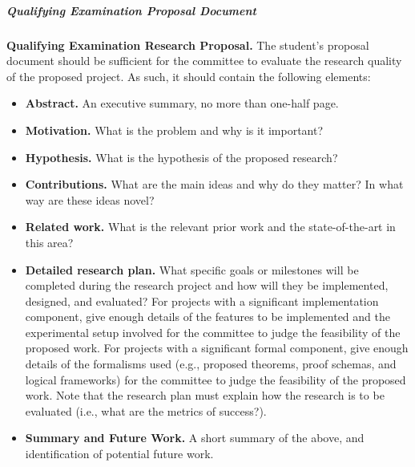 


\hypertarget{qualifying-examination-proposal-document}{
\subparagraph{Qualifying Examination Proposal Document}
\label{qualifying-examination-proposal-document}
}

\textbf{Qualifying Examination Research Proposal.}
The student's proposal document should be sufficient for the committee
to evaluate the research quality of the proposed project. As such, it
should contain the following elements:

\begin{itemize}[nosep]
\item \textbf{Abstract.} An executive summary, no more than one-half page.

\item \textbf{Motivation.} What is the problem and why is it important?

\item \textbf{Hypothesis.} What is the hypothesis of the proposed research?

\item \textbf{Contributions.} What are the main ideas and why do they matter?
In what way are these ideas novel?

\item \textbf{Related work.} What is the relevant prior work and the
state-of-the-art in this area?

\item \textbf{Detailed research plan.} What specific goals or milestones will
be completed during the research project and how will they be
implemented, designed, and evaluated? For projects with a significant
implementation component, give enough details of the features to be
implemented and the experimental setup involved for the committee to
judge the feasibility of the proposed work. For projects with a
significant formal component, give enough details of the formalisms used
(e.g., proposed theorems, proof schemas, and logical frameworks) for the
committee to judge the feasibility of the proposed work. Note that the
research plan must explain how the research is to be evaluated (i.e.,
what are the metrics of success?).

\item \textbf{Summary and Future Work.} A short summary of the above, and
identification of potential future work.

\end{itemize}

